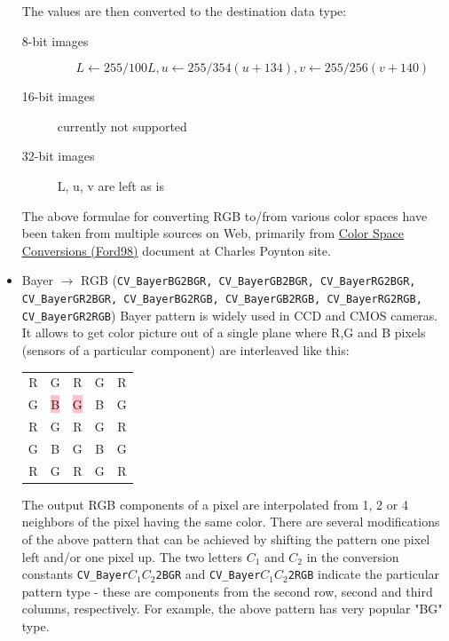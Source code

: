 \begin{itemize}
The values are then converted to the destination data type:
\begin{description}
\item[8-bit images]
\[L \leftarrow 255/100 L, u \leftarrow 255/354 (u + 134), v \leftarrow 255/256 (v + 140) \]
\item[16-bit images] currently not supported
\item[32-bit images] L, u, v are left as is
\end{description}

  The above formulae for converting RGB to/from various color spaces have been taken from multiple sources on Web, primarily from
  \href{http://opencvlibrary.sourceforge.net/Welcome?action=AttachFile&do=get&target=opencvref\_cv.htm\#paper\_ford98}{Color Space Conversions (Ford98)} document at Charles Poynton site.

 \item Bayer $\rightarrow$ RGB (\texttt{CV\_BayerBG2BGR, CV\_BayerGB2BGR, CV\_BayerRG2BGR, CV\_BayerGR2BGR, CV\_BayerBG2RGB, CV\_BayerGB2RGB, CV\_BayerRG2RGB, CV\_BayerGR2RGB}) Bayer pattern is widely used in CCD and CMOS cameras. It allows to get color picture out of a single plane where R,G and B pixels (sensors of a particular component) are interleaved like this:

\newcommand{\R}{\color{red}R}
\newcommand{\G}{\color{green}G}
\newcommand{\B}{\color{blue}B}
{\Huge
\begin{tabular}{ c c c c c }
\R&\G&\R&\G&\R\\
\G&\colorbox{pink}{\B}&\colorbox{pink}{\G}&\B&\G\\
\R&\G&\R&\G&\R\\
\G&\B&\G&\B&\G\\
\R&\G&\R&\G&\R
\end{tabular}
}

The output RGB components of a pixel are interpolated from 1, 2 or
4 neighbors of the pixel having the same color. There are several
modifications of the above pattern that can be achieved by shifting
the pattern one pixel left and/or one pixel up. The two letters
$C_1$ and $C_2$
in the conversion constants
\texttt{CV\_Bayer}$C_1 C_2$\texttt{2}\texttt{BGR}
and
\texttt{CV\_Bayer}$C_1 C_2$\texttt{2}\texttt{RGB}
indicate the particular pattern
type - these are components from the second row, second and third
columns, respectively. For example, the above pattern has very
popular "BG" type.
\end{itemize}

\label{Threshold}

